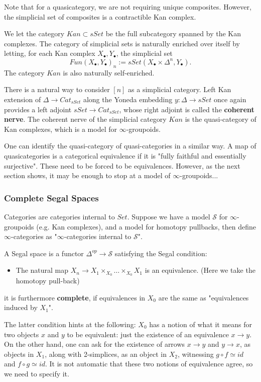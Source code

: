 Note that for a quasicategory, we are not requiring unique composites. However, the simplicial set of composites is a contractible Kan complex.

We let the category $Kan\subset sSet$ be the full subcategory spanned by the Kan complexes. The category of simplicial sets is naturally enriched over itself by letting, for each Kan complex $X_\bullet,Y_\bullet$, the simplicial set $$Fun(X_\bullet,Y_\bullet)_{n}:=sSet(X_\bullet\times\Delta^n,Y_\bullet).$$ The category $Kan$ is also naturally self-enriched.

There is a natural way to consider $[n]$ as a simplicial category. Left Kan extension of $\Delta\rightarrow Cat_{sSet}$ along the Yoneda embedding $y:\Delta\rightarrow sSet$ once again provides a left adjoint $sSet\rightarrow Cat_{sSet}$, whose right adjoint is called the \textbf{coherent nerve}. The coherent nerve of the simplicial category $Kan$ is the quasi-category of Kan complexes, which is a model for $\infty$-groupoids.

One can identify the quasi-category of quasi-categories in a similar way. A map of quasicategories is a categorical equivalence if it is "fully faithful and essentially surjective". These need to be forced to be equivalences. However, as the next section shows, it may be enough to stop at a model of $\infty$-groupoids...

\subsubsection{Complete Segal Spaces}
Categories are categories internal to $Set$. Suppose we have a model $\mathcal{S}$ for $\infty$-groupoids (e.g. Kan complexes), and a model for homotopy pullbacks, then define $\infty$-categories as "$\infty$-categories internal to $\mathcal{S}$".

\begin{definition}
    A Segal space is a functor $\Delta^{op}\rightarrow \mathcal{S}$ satisfying the Segal condition:
    \begin{itemize}
        \item The natural map $X_{n}\rightarrow  X_1\times_{X_0}\dots \times_{X_0} X_1$ is an equivalence. (Here we take the homotopy pull-back)
    \end{itemize}
    it is furthermore \textbf{complete}, if equivalences in $X_0$ are the same as "equivalences induced by $X_1$".
\end{definition}

The latter condition hints at the following: $X_0$ has a notion of what it means for two objects $x$ and $y$ to be equivalent: just the existence of an equivalence $x\rightarrow y$. On the other hand, one can ask for the existence of arrows $x\rightarrow y$ and $y\rightarrow x$, as objects in $X_1$, along with 2-simplices, as an object in $X_2$, witnessing $g\circ f\simeq id$ and $f\circ g \simeq id$. It is not automatic that these two notions of equivalence agree, so we need to specify it.

